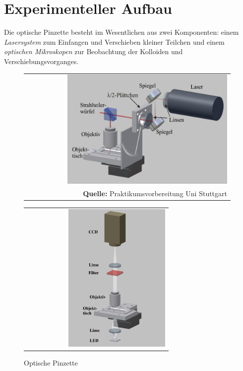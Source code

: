 \documentclass[a4paper,titlepage]{scrartcl}
\numberwithin{equation}{section}
\begin{document}
\section{Experimenteller Aufbau}
Die optische Pinzette besteht im Wesentlichen aus zwei Komponenten: einem \emph{Lasersystem} zum Einfangen und Verschieben kleiner Teilchen und einem \emph{optischen Mikroskopen} zur Beobachtung der Kolloiden und Verschiebungsvorganges.
\begin{figure}[H]
\begin{minipage}{.5\textwidth}
\centering
\begin{tabular}{@{}r@{}}
\includegraphics[width=0.8\textwidth]{images/pinzette.PNG}\\
\footnotesize\sffamily\textbf{Quelle:} Praktikumsvorbereitung Uni Stuttgart \cite{praktikum}
\end{tabular}
\caption{Optische Pinzette}
\label{fig:pinzette}
\end{minipage}
\begin{minipage}{.5\textwidth}
\centering
\begin{tabular}{@{}r@{}}
\includegraphics[width=0.7\textwidth]{images/mikroskop.PNG}\\

\end{tabular}
\end{minipage}
\end{figure}
\end{document}
